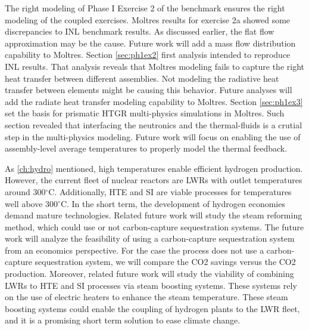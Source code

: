 The right modeling of Phase I Exercise 2 of the benchmark ensures the right modeling of the coupled exercises.
Moltres results for exercise 2a showed some discrepancies to INL benchmark results.
As discussed earlier, the flat flow approximation may be the cause.
Future work will add a mass flow distribution capability to Moltres.
Section \ref{sec:ph1ex2} first analysis intended to reproduce INL results.
That analysis reveals that Moltres modeling fails to capture the right heat transfer between different assemblies.
Not modeling the radiative heat transfer between elements might be causing this behavior.
Future analyses will add the radiate heat transfer modeling capability to Moltres.
Section \ref{sec:ph1ex3} set the basis for prismatic HTGR multi-physics simulations in Moltres.
Such section revealed that interfacing the neutronics and the thermal-fluids is a crutial step in the multi-physics modeling.
Future work will focus on enabling the use of assembly-level average temperatures to properly model the thermal feedback.


As \ref{ch:hydro} mentioned, high temperatures enable efficient hydrogen production.
However, the current fleet of nuclear reactors are LWRs with outlet temperatures around 300$^{\circ}$C.
Additionally, HTE and SI are viable processes for temperatures well above 300$^{\circ}$C.
In the short term, the development of hydrogen economies demand mature technologies.
Related future work will study the steam reforming method, which could use or not carbon-capture sequestration systems.
The future work will analyze the feasibility of using a carbon-capture sequestration system from an economics perspective.
For the case the process does not use a carbon-capture sequestration system, we will compare the \gls{CO2} savings versus the \gls{CO2} production.
Moreover, related future work will study the viability of combining LWRs to HTE and SI processes via steam boosting systems.
These systems rely on the use of electric heaters to enhance the steam temperature.
These steam boosting systems could enable the coupling of hydrogen plants to the LWR fleet, and it is a promising short term solution to ease climate change.
